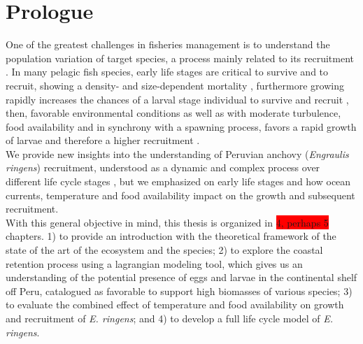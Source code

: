 \chapter{Prologue}

One of the greatest challenges in fisheries management is to understand the population variation of target species, a process mainly related to its recruitment \citep{Cush1971,Lask1981,MaunThor2019}. In many pelagic fish species, early life stages are critical to survive and to recruit, showing a density- and size-dependent mortality \citep{StigRoge2019}, furthermore growing rapidly increases the chances of a larval stage individual to survive and recruit \citep{OsseBoog1997,Soga1997,MeekVigl2006}, then, favorable environmental conditions as well as with moderate turbulence, food availability and in synchrony with a spawning process, favors a rapid growth of larvae and therefore a higher recruitment \citep{CuryRoy1989}.\\

We provide new insights into the understanding of Peruvian anchovy (\textit{Engraulis ringens}) recruitment, understood as a dynamic and complex process over different life cycle stages \citep{DuffBail2005}, but we emphasized on early life stages and how ocean currents, temperature and food availability impact on the growth and subsequent recruitment.\\

With this general objective in mind, this thesis is organized in \colorbox{red}{4, perhaps 5} chapters. 1) to provide an introduction with the theoretical framework of the state of the art of the ecosystem and the species; 2) to explore the coastal retention process using a lagrangian modeling tool, which gives us an understanding of the potential presence of eggs and larvae in the continental shelf off Peru, catalogued as favorable to support high biomasses of various species; 3) to evaluate the combined effect of temperature and food availability on growth and recruitment of \textit{E. ringens}; and 4) to develop a full life cycle model of \textit{E. ringens}. 